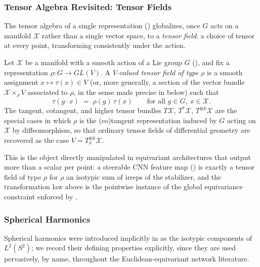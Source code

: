 \documentclass[mathematics,review,submit,moreauthors]{Definitions/mdpi}
\begin{document}
\subsubsection{Tensor Algebra Revisited: Tensor Fields}
\label{subsec:tensor-fields}

The tensor algebra of a single representation
() globalizes, once $G$ acts on a
manifold $\mathcal{X}$ rather than a single vector space, to a \emph{tensor field}: a
choice of tensor at every point, transforming consistently under the action.

\begin{Definition}
\label{def:tensor-field}
Let $\mathcal{X}$ be a manifold with a smooth action of a Lie group $G$
(), and fix a representation
$\rho : G \to GL(V)$. A \emph{$V$-valued tensor field of type $\rho$} is a
smooth assignment $x \mapsto \tau(x) \in V$ (or, more generally, a section of
the vector bundle $\mathcal{X} \times_\rho V$ associated to $\rho$, in the sense made
precise in  below) such that
\[
    \tau(g \cdot x) \;=\; \rho(g)\, \tau(x) \qquad \text{for all } g \in G,\ x \in \mathcal{X}.
\]
The tangent, cotangent, and higher tensor bundles $T\mathcal{X}$, $T^*\mathcal{X}$,
$T^{\otimes k}\mathcal{X}$ are the special cases in which $\rho$ is the (co)tangent
representation induced by $G$ acting on $\mathcal{X}$ by diffeomorphism, so that
ordinary tensor fields of differential geometry are recovered as the case
$V = T_x^{\otimes k}\mathcal{X}$.
\end{Definition}

This is the object directly manipulated in equivariant architectures that
output more than a scalar per point: a steerable CNN feature map
() is exactly a tensor field of type
$\rho$ for $\rho$ an isotypic sum of irreps of the stabilizer, and the
transformation law above is the pointwise instance of the global
equivariance constraint enforced by .

\subsubsection{Spherical Harmonics}
\label{subsec:spherical-harmonics}

Spherical harmonics were introduced implicitly in
 as the isotypic components
of $L^2(S^2)$; we record their defining properties explicitly, since they
are used pervasively, by name, throughout the Euclidean-equivariant network
literature.
\end{document}
